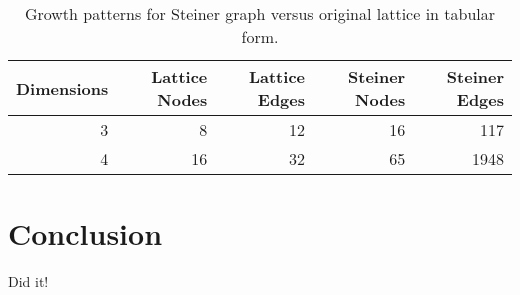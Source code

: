 \documentclass[12pt]{dalcsthesis}
\begin{document}
\begin{table}[tbh]
\centering
\begin{tabular}{|r|r|r|r|r|}
    \hline
    Dimensions & Lattice Nodes & Lattice Edges & Steiner Nodes & Steiner Edges \\
    \hline \hline
    3 & 8 & 12 & 16 & 117 \\
    \hline
    4 & 16 & 32 & 65 & 1948 \\
    \hline
\end{tabular}
 \caption{\label{tab-steiner_growth}Growth patterns for Steiner
    graph versus original lattice in tabular form. }
\end{table}


\chapter{Conclusion}

Did it!



\end{document}
